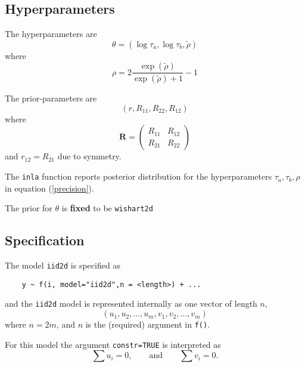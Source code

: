\documentclass[a4paper,11pt]{article}
\begin{document}
\subsection*{Hyperparameters}

The hyperparameters are
\begin{displaymath}
    \theta = (\log\tau_{a}, \log\tau_{b}, \tilde\rho)
\end{displaymath}
where
\begin{displaymath}
    \rho =
    2\frac{\exp(\tilde\rho)}{\exp(\tilde{\rho})+1} -1
\end{displaymath}

The prior-parameters are
\begin{displaymath}
    (r,R_{11},R_{22},R_{12})
\end{displaymath}
where
\begin{displaymath}
    \mathbf{R}= \left(\begin{array}{cc}
          R_{11} &R_{12}\\
          R_{21} & R_{22}
      \end{array}\right)
\end{displaymath}
and $r_{12}=R_{21}$ due to symmetry.

The {\tt inla} function reports posterior distribution for the
hyperparameters $\tau_a,\tau_b,\rho$ in equation (\ref{precision}).

The prior for $\theta$ is {\bf fixed} to be {\tt wishart2d}


\subsection*{Specification}

The model \texttt{iid2d}
is specified as
\begin{verbatim}
    y ~ f(i, model="iid2d",n = <length>) + ...
\end{verbatim}
and the \texttt{iid2d} model is represented internally as one vector
of length $n$,
\begin{displaymath}
    (u_{1}, u_{2}, \ldots, u_{m}, v_{1}, v_{2}, \ldots, v_{m})
\end{displaymath}
where $n = 2m$, and $n$ is the (required) argument in
\texttt{f()}.

For this model the argument \texttt{constr=TRUE} is interpreted as
\begin{displaymath}
    \sum u_{i} = 0, \qquad\text{and}\qquad \sum v_{i} = 0.
\end{displaymath}
\end{document}

